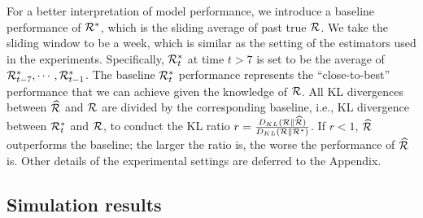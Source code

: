 For a better interpretation of model performance, we introduce a baseline performance of
$\mathcal{R}^{\ast}$, which is the sliding average of past true $\mathcal{R}$. We take 
the sliding window to be a week, which is similar as the setting of the estimators 
used in the experiments. Specifically, $\mathcal{R}^{\ast}_t$ at time $t>7$ is set to be 
the average of $\mathcal{R}^{\ast}_{t-7},\cdots,\mathcal{R}^{\ast}_{t-1}$. 
The baseline $\mathcal{R}^{\ast}_t$ performance represents the ``close-to-best'' performance 
that we can achieve given the knowledge of $\mathcal{R}$. 
All KL divergences between $\widehat{\mathcal{R}}$ and $\mathcal{R}$ are divided by the 
corresponding baseline, i.e., KL divergence between $\mathcal{R}^{\ast}_t$ and $\mathcal{R}$, 
to conduct the KL ratio $r = \frac{D_{KL}(\mathcal{R} \parallel \widehat{\mathcal{R}})}{D_{KL}(\mathcal{R} \parallel \mathcal{R}^{\ast})}$. 
If $r<1$, $\widehat{\mathcal{R}}$ outperforms the baseline; the larger the ratio is, 
the worse the performance of $\widehat{\mathcal{R}}$ is. 
Other details of the experimental settings are deferred to the Appendix. 


\subsection{Simulation results}

